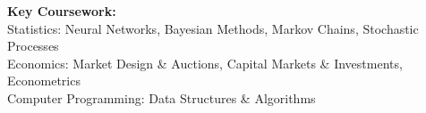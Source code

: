 \textbf{Key Coursework:} \\
Statistics: Neural Networks, Bayesian Methods, Markov Chains, Stochastic Processes \\
Economics: Market Design \& Auctions, Capital Markets \& Investments, Econometrics \\
Computer Programming: Data Structures \& Algorithms
